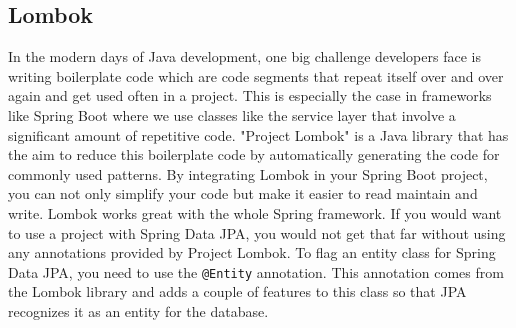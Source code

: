     \subsection{Lombok}
    In the modern days of Java development, one big challenge developers face is writing boilerplate code which are code segments that repeat itself over and over again and get used often in a project. This is especially the case in frameworks like Spring Boot where we use classes like the service layer that involve a significant amount of repetitive code.
    "Project Lombok" is a Java library that has the aim to reduce this boilerplate code by automatically generating the code for commonly used patterns. By integrating Lombok in your Spring Boot project, you can not only simplify your code but make it easier to read maintain and write. 
    Lombok works great with the whole Spring framework. If you would want to use a project with Spring Data JPA, you would not get that far without using any annotations provided by Project Lombok. To flag an entity class for Spring Data JPA, you need to use the \texttt{@Entity} annotation. This annotation comes from the Lombok library and adds a couple of 
    features to this class so that JPA recognizes it as an entity for the database.
    

